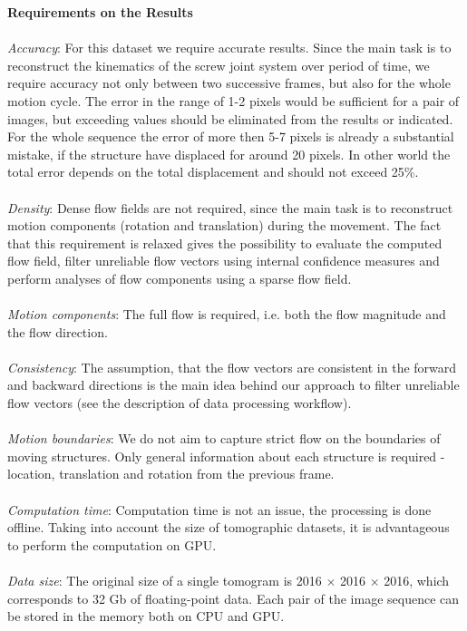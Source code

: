 \textbf{Requirements on the Results}
\\
\\
\textit{Accuracy}: For this dataset we require accurate results. Since the main task is to reconstruct the kinematics of the screw joint system over period of time, we require accuracy not only between two successive frames, but also for the whole motion cycle.  The error in the range of 1-2 pixels would be sufficient for a pair of images, but exceeding values should be eliminated from the results or indicated. For the whole sequence the error of more then 5-7 pixels is already a substantial mistake, if the structure have displaced for around 20 pixels. In other world the total error depends on the total displacement and should not exceed 25\%.
\\
\\
\textit{Density}: Dense flow fields are not required, since the main task is to reconstruct motion components (rotation and translation) during the movement. The fact that this requirement is relaxed gives the possibility to evaluate the computed flow field, filter unreliable flow vectors using internal confidence measures and perform analyses of flow components using a sparse flow field. 
\\
\\
\textit{Motion components}: The full flow is required, i.e. both the flow magnitude and the flow direction. 
\\
\\
\textit{Consistency}:  The assumption, that the flow vectors are consistent in the forward and backward directions is the main idea behind our approach to filter unreliable flow vectors (see the description of data processing workflow).
\\
\\
\textit{Motion boundaries}: We do not aim to capture strict flow on the boundaries of moving structures. Only general information about each structure is required - location, translation and rotation from the previous frame.
\\
\\
\textit{Computation time}: Computation time is not an issue, the processing is done offline. Taking into account the size of tomographic datasets, it is advantageous to perform the computation on GPU.
\\
\\
\textit{Data size}: The original size of a single tomogram is 2016 $\times$ 2016 $\times$ 2016,  which corresponds to 32 Gb of floating-point data. Each pair of the image sequence can be stored in the memory both on CPU and GPU. 



